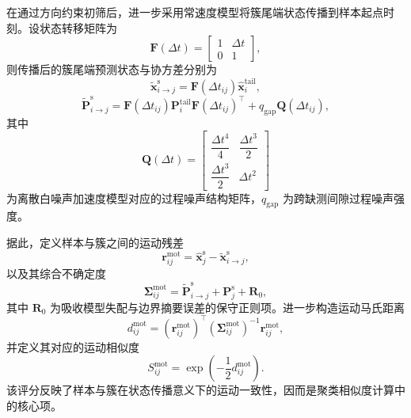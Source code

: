 \documentclass{xdupgthesis}
\begin{document}
在通过方向约束初筛后，进一步采用常速度模型将簇尾端状态传播到样本起点时刻。设状态转移矩阵为
\begin{equation}
	\mathbf{F}(\Delta t)=
	\begin{bmatrix}
		1 & \Delta t\\
		0 & 1
	\end{bmatrix},
\end{equation}
则传播后的簇尾端预测状态与协方差分别为
\begin{equation}
	\tilde{\mathbf{x}}_{i\rightarrow j}^{\mathrm{s}}
	=
	\mathbf{F}(\Delta t_{ij})\hat{\mathbf{x}}_i^{\mathrm{tail}},
\end{equation}
\begin{equation}
	\tilde{\mathbf{P}}_{i\rightarrow j}^{\mathrm{s}}
	=
	\mathbf{F}(\Delta t_{ij})\mathbf{P}_i^{\mathrm{tail}}\mathbf{F}(\Delta t_{ij})^{\top}
	+
	q_{\mathrm{gap}}\mathbf{Q}(\Delta t_{ij}),
\end{equation}
其中
\begin{equation}
	\mathbf{Q}(\Delta t)=
	\begin{bmatrix}
		\dfrac{\Delta t^4}{4} & \dfrac{\Delta t^3}{2}\\[6pt]
		\dfrac{\Delta t^3}{2} & \Delta t^2
	\end{bmatrix}
\end{equation}
为离散白噪声加速度模型对应的过程噪声结构矩阵，$q_{\mathrm{gap}}$ 为跨缺测间隙过程噪声强度。

据此，定义样本与簇之间的运动残差
\begin{equation}
	\mathbf{r}_{ij}^{\mathrm{mot}}
	=
	\hat{\mathbf{x}}_j^{\mathrm{s}}
	-
	\tilde{\mathbf{x}}_{i\rightarrow j}^{\mathrm{s}},
\end{equation}
以及其综合不确定度
\begin{equation}
	\mathbf{\Sigma}_{ij}^{\mathrm{mot}}
	=
	\tilde{\mathbf{P}}_{i\rightarrow j}^{\mathrm{s}}
	+
	\mathbf{P}_j^{\mathrm{s}}
	+
	\mathbf{R}_{0},
\end{equation}
其中 $\mathbf{R}_{0}$ 为吸收模型失配与边界摘要误差的保守正则项。进一步构造运动马氏距离
\begin{equation}
	d_{ij}^{\mathrm{mot}}
	=
	\left(\mathbf{r}_{ij}^{\mathrm{mot}}\right)^{\top}
	\left(\mathbf{\Sigma}_{ij}^{\mathrm{mot}}\right)^{-1}
	\mathbf{r}_{ij}^{\mathrm{mot}},
\end{equation}
并定义其对应的运动相似度
\begin{equation}
	S_{ij}^{\mathrm{mot}}
	=
	\exp\!\left(-\frac{1}{2}d_{ij}^{\mathrm{mot}}\right).
\end{equation}
该评分反映了样本与簇在状态传播意义下的运动一致性，因而是聚类相似度计算中的核心项。
\end{document}
